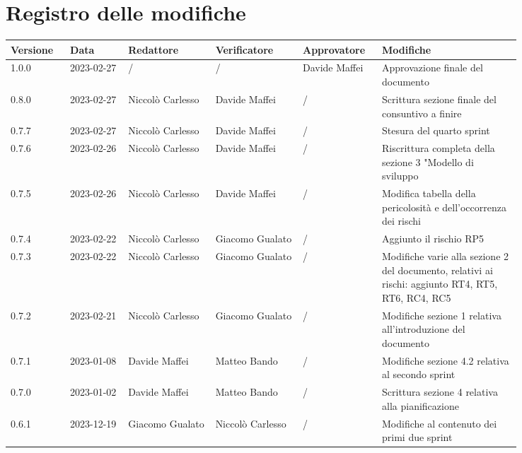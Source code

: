\section*{Registro delle modifiche}
{
\renewcommand{\arraystretch}{1.5}
\scriptsize
\begin{longtable}{p{0.10\linewidth}p{0.10\linewidth}p{0.15\linewidth}p{0.15\linewidth}p{0.10\linewidth}p{0.24\linewidth}}
	\textbf{Versione} & \textbf{Data} & \textbf{Redattore} & \textbf{Verificatore} & \textbf{Approvatore} & \textbf{Modifiche}	\\
	\toprule
	1.0.0             & 2023-02-27    &  /    & / 	& Davide Maffei & Approvazione finale del documento	\\
	\hline
	0.8.0             & 2023-02-27    & Niccolò Carlesso    & Davide Maffei 	& /	& Scrittura sezione finale del consuntivo a finire	\\
	\hline
	0.7.7             & 2023-02-27    & Niccolò Carlesso    & Davide Maffei	& /	& Stesura del quarto sprint	\\
	\hline
	0.7.6             & 2023-02-26    & Niccolò Carlesso    & Davide Maffei	& /	& Riscrittura completa della sezione 3 "Modello di sviluppo	\\
	\hline
	0.7.5             & 2023-02-26    & Niccolò Carlesso    & Davide Maffei	& /	& Modifica tabella della pericolosità e dell’occorrenza dei rischi	\\
	\hline
	0.7.4             & 2023-02-22    & Niccolò Carlesso    & Giacomo Gualato	& /	& Aggiunto il rischio RP5								\\
	\hline
	0.7.3             & 2023-02-22    & Niccolò Carlesso    & Giacomo Gualato	& /	& Modifiche varie alla sezione 2 del documento, relativi ai rischi: 
																	  aggiunto RT4, RT5, RT6, RC4, RC5 						\\
	\hline
	0.7.2             & 2023-02-21    & Niccolò Carlesso    & Giacomo Gualato	& /	& Modifiche sezione 1 relativa all'introduzione del documento 		\\
	\hline
	0.7.1             & 2023-01-08    & Davide Maffei    	& Matteo Bando	& /	& Modifiche sezione 4.2 relativa al secondo sprint 		\\
	\hline
	0.7.0             & 2023-01-02    & Davide Maffei        & Matteo Bando	& /	& Scrittura sezione 4 relativa alla pianificazione 		\\
	\hline
	0.6.1			  & 2023-12-19    & Giacomo Gualato      & Niccolò Carlesso 	& /	& Modifiche al contenuto dei primi due sprint				\\
	\hline

\end{longtable}}

